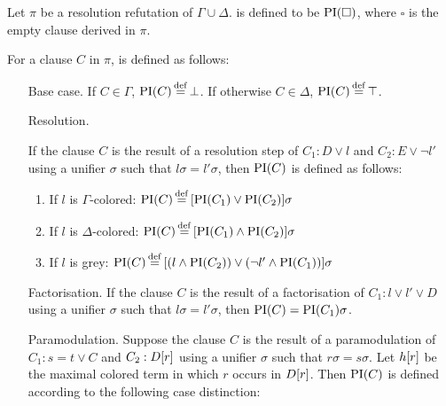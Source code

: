 \begin{defi}
	Let $\pi$ be a resolution refutation of $\Gamma \cup \Delta$.
	 is defined to be $\operatorname{PI}(\square)$, where $\square$ is the empty clause derived in $\pi$.

	For a clause $C$ in $\pi$,  is defined as follows:
	\label{def:PI}
	\begin{itemize}
		\item[Base case.]
			If $C \in \Gamma$, $\operatorname{PI}(C) \operatorname{\stackrel{\mathrm{def}}{=}} \bot$.
			If otherwise $C \in \Delta$, $\operatorname{PI}(C) \operatorname{\stackrel{\mathrm{def}}{=}} \top$.
		\item[Resolution.]
			\label{def:PI_resolution}

      If the clause $C$ is the result of a resolution step of $C_1: D \lor l$ and $C_2: E \lor \lnot l'$ using a unifier $\sigma$ such that $l\sigma = l'\sigma$, then $\operatorname{PI}(C)$ is defined as follows:
      \begin{enumerate}
				\item If $l$ is $\Gamma$-colored: $\operatorname{PI}(C) \operatorname{\stackrel{\mathrm{def}}{=}}{} [\operatorname{PI}(C_1) \lor \operatorname{PI}(C_2)]\sigma$
				\item If $l$ is $\Delta$-colored: $\operatorname{PI}(C) \operatorname{\stackrel{\mathrm{def}}{=}}{} [\operatorname{PI}(C_1) \land \operatorname{PI}(C_2)]\sigma$
				\item If $l$ is grey: $\operatorname{PI}(C) \operatorname{\stackrel{\mathrm{def}}{=}}{} [(l \land \operatorname{PI}(C_2)) \lor (\lnot l' \land \operatorname{PI}(C_1)) ]\sigma $
      \end{enumerate}

    \item[Factorisation.]
      If the clause $C$ is the result of a factorisation of $C_1: l \lor l' \lor D$ using a unifier $\sigma$ such that $l\sigma = l'\sigma$, then $\operatorname{PI}(C) = \operatorname{PI}(C_1)\sigma$.

    \item[Paramodulation.]
  \label{def:PI_paramod}
      Suppose the clause $C$ is the result of a paramodulation of $C_1: s=t \lor C$ and $C_2: D[r]$ using a       unifier $\sigma$ such that $r\sigma = s\sigma$.
      Let $h[r]$ be the maximal colored term in which $r$ occurs in $D[r]$.
      Then $\operatorname{PI}(C)$ is defined according to the following case distinction:
      \begin{enumerate}


\end{enumerate}
\end{itemize}
\end{defi}
